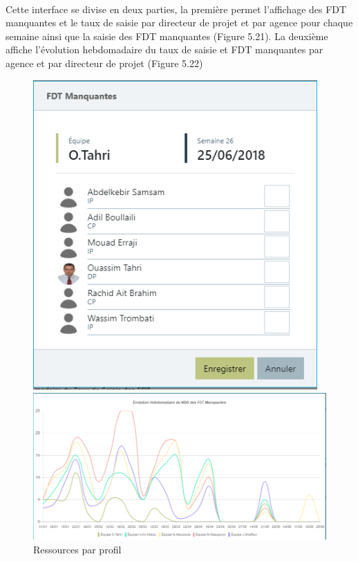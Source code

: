 \begin{itemize}[label=\textbullet]
\begin{itemize}
\begin{figure}[h!]
			\end{figure}
\\
Cette interface se divise en deux parties, la première permet l'affichage des FDT manquantes et le taux de saisie par directeur de projet et par agence pour chaque semaine ainsi que la saisie des FDT manquantes (Figure 5.21). La deuxième affiche l'évolution hebdomadaire du taux de saisie et FDT manquantes par agence et par directeur de projet (Figure 5.22)
\begin{figure}[h]
    \begin{minipage}[c]{.46\linewidth}
        \centering
        \includegraphics[width=0.97\textwidth]{chapitre5/Figures/saisiefdt.png}
        \caption{Ressources par profil}
    \end{minipage}
    \hfill%
    \begin{minipage}[c]{.46\linewidth}
        \centering
        \includegraphics[width=1\textwidth]{chapitre5/Figures/evolution.png}

\end{minipage}
\end{figure}
\end{itemize}
\end{itemize}
